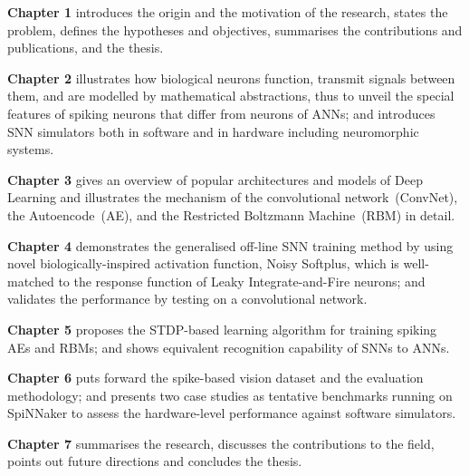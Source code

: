 \textbf{Chapter 1} introduces the origin and the motivation of the research, states the problem, defines the hypotheses and objectives, summarises the contributions and publications, and \DIFdelbegin {}\DIFdelend \DIFaddbegin {}\DIFaddend the thesis. 

\textbf{Chapter 2} %
illustrates how biological neurons function, transmit signals between them, and are modelled by mathematical abstractions, thus to unveil the special features of spiking neurons that differ from \DIFaddbegin {}\DIFaddend neurons of ANNs; and introduces SNN simulators both in software and in hardware including neuromorphic systems.

\textbf{Chapter 3} gives an overview of popular architectures and models of Deep Learning and illustrates the mechanism of the convolutional network~(ConvNet), the Autoencode~(AE), and the Restricted Boltzmann Machine~(RBM) in detail.

\textbf{Chapter 4} demonstrates the generalised off-line SNN training method by using \DIFaddbegin {}\DIFaddend novel biologically-inspired activation function, Noisy Softplus, which is well-matched to the response function of Leaky Integrate-and-Fire neurons; and validates the performance by testing on a convolutional network.

\textbf{Chapter 5} proposes the STDP-based learning algorithm for training spiking AEs and RBMs; and shows equivalent recognition capability of SNNs \DIFdelbegin {}\DIFdelend \DIFaddbegin {}\DIFaddend to ANNs.

\textbf{Chapter 6} puts forward the spike-based vision dataset and the evaluation methodology; and presents two case studies as tentative benchmarks running on SpiNNaker to assess the hardware-level performance against software simulators.

\textbf{Chapter 7} summarises the research, discusses the contributions to the field, points out future directions and concludes the thesis.



